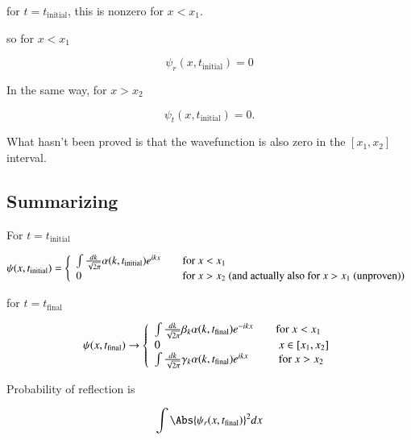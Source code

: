 for $t = t_{\text{initial}}$, this is nonzero for $x < x_1$.

so for $x < x_1$

\begin{equation}\label{eqn:qmTwoL22:310}
\psi_r(x, t_{\text{initial}}) = 0
\end{equation}

In the same way, for $x > x_2$

\begin{equation}\label{eqn:qmTwoL22:330}
\psi_t(x, t_{\text{initial}}) = 0.
\end{equation}

What hasn't been proved is that the wavefunction is also zero in the $[x_1, x_2]$ interval.

\subsection{Summarizing}

For $t = t_{\text{initial}}$

\begin{equation}\label{eqn:qmTwoL22:350}
\psi(x, t_{\text{initial}})
=
\left\{
\begin{array}{l l}
\int \frac{dk}{\sqrt{2 \pi}} \alpha(k, t_{\text{initial}}) e^{i k x} &\quad \mbox{for $x < x_1$} \\
0 & \quad \mbox{for $x > x_2$ (and actually also for $x > x_1$ (unproven))}
\end{array}
\right.
\end{equation}

for $t = t_{\text{final}}$

\begin{equation}\label{eqn:qmTwoL22:370}
\psi(x, t_{\text{final}})
\rightarrow
\left\{
\begin{array}{l l}
\int \frac{dk}{\sqrt{2 \pi}} \beta_k \alpha(k, t_{\text{final}}) e^{-i k x} &\quad \mbox{for $x < x_1$} \\
0 & \quad \mbox{ $x \in [x_1, x_2]$} \\
\int \frac{dk}{\sqrt{2 \pi}} \gamma_k \alpha(k, t_{\text{final}}) e^{i k x}
 & \quad \mbox{ for $x > x_2$ }
\end{array}
\right.
\end{equation}

Probability of reflection is

\begin{equation}\label{eqn:qmTwoL22:390}
\int \Abs{\psi_r(x, t_{\text{final}})}^2 dx
\end{equation}

